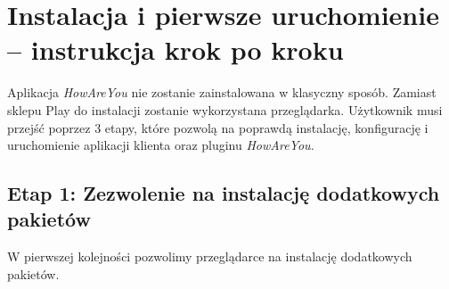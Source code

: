\chapter{Instalacja i pierwsze uruchomienie -- instrukcja krok po kroku}
\label{cha:instalacjaIPierwszeUruchomienie}


Aplikacja \textit{HowAreYou} nie zostanie zainstalowana w klasyczny sposób. Zamiast sklepu Play do instalacji zostanie wykorzystana przeglądarka. Użytkownik musi przejść poprzez 3 etapy, które pozwolą na poprawdą instalację, konfigurację i uruchomienie aplikacji klienta oraz pluginu \textit{HowAreYou}.


\section{Etap 1: Zezwolenie na instalację dodatkowych pakietów}
\label{sec:zezwolenieNaInstalacjeDodatkowychPakietow}

W pierwszej kolejności pozwolimy przeglądarce na instalację dodatkowych pakietów.

